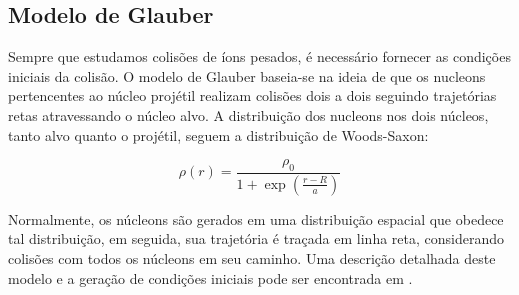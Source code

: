 \subsection{Modelo de Glauber}\label{glauber}

Sempre que estudamos colisões de íons pesados, é necessário fornecer as condições iniciais da colisão. O modelo
de Glauber baseia-se na ideia de que os nucleons pertencentes ao núcleo projétil realizam colisões dois a dois seguindo trajetórias
retas atravessando o núcleo alvo. A distribuição dos nucleons nos dois núcleos, tanto alvo quanto o projétil, seguem a distribuição de
Woods-Saxon:

\begin{equation}
 \rho(r) = \frac{\rho_0}{1+\exp{(\frac{r-R}{a})}}
\end{equation}

Normalmente, os núcleons são gerados em uma distribuição espacial que obedece tal distribuição, em seguida, sua trajetória
é traçada em linha reta, considerando colisões com todos os núcleons em seu caminho. Uma descrição detalhada deste modelo e a
geração de condições iniciais pode ser encontrada em \cite{miller_glauber_2007}.